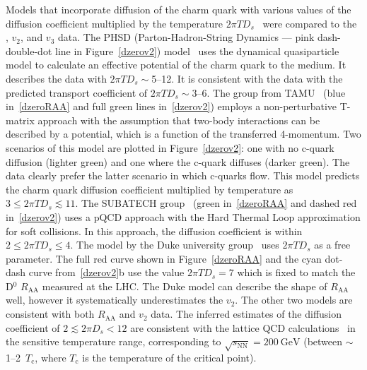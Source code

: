 % 


Models that incorporate diffusion of the charm quark with various values of the diffusion coefficient multiplied by 
the temperature $2\pi T D_s$~\cite{PHSD2014,LBT, LBTprivate, TAMU,PHSD2015,SUBATECHvn,SUBATECHquenching,Duke,Duke2015} were compared to the \Raa,  $v_2$, and $v_3$ data. The PHSD 
(Parton-Hadron-String Dynamics --- pink dash-double-dot line
in Figure~\ref{dzerov2}) model~\cite{PHSD2014,PHSD2015} uses the dynamical quasiparticle model to calculate 
an effective potential of the charm quark to the medium. It describes the data with $2\pi T D_s \sim$5--12.
It is consistent with the data with the predicted transport coefficient of $2\pi T D_s \sim$3--6.
The group from TAMU~\cite{TAMU} (blue in~\ref{dzeroRAA} and full green lines in~\ref{dzerov2}) employs
a non-perturbative T-matrix approach with the assumption
that two-body interactions can be described by a potential, which is a function of the transferred
4-momentum. Two scenarios of this model are plotted in Figure~\ref{dzerov2}: one with no c-quark diffusion (lighter green) 
and one where the c-quark diffuses (darker green). The data clearly prefer the latter scenario in which
c-quarks flow.
This model predicts the charm quark diffusion coefficient multiplied by temperature as
$3 \leq 2\pi T D_s \lesssim 11$\@.
The SUBATECH group~\cite{SUBATECHvn}\nocite{SUBATECHquenching} (green in~\ref{dzeroRAA} and dashed red in~\ref{dzerov2}) uses a pQCD approach 
with the Hard Thermal Loop approximation for soft collisions.
In this approach, the diffusion coefficient is within $2 \leq 2\pi T D_s \leq 4$\@.
The model by the Duke university group~\cite{Duke,Duke2015} uses
$2\pi T D_s$ as a free parameter. The full red curve shown in Figure~\ref{dzeroRAA} and the cyan dot-dash curve from~\ref{dzerov2}b use
the value $2\pi T D_s = 7$ which is fixed to match the D$^0$ $R_\mathrm{AA}$ measured at
the LHC\@. The Duke model can describe the shape of $R_\mathrm{AA}$ well, however it systematically
underestimates the $v_2$\@. The other two models are consistent with 
both $R_\mathrm{AA}$ and $v_2$ data. The inferred estimates of the diffusion coefficient of $2 \lesssim 2 \pi D_s < 12$ are 
consistent with the lattice QCD calculations~\cite{DingLattice,BanerjeeLattice}\nocite{continuumEstimate,Tmatrix,SvetinskyDiffusion} 
in the sensitive temperature range, corresponding to $\sqrt{s_\mathrm{NN}} = \SI{200}{\giga\electronvolt}$ (between $\sim$1--2~$T_\mathrm{c}$, 
where $T_\mathrm{c}$ is the temperature of the critical point). 

